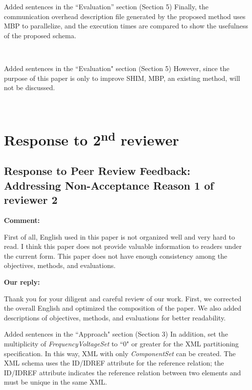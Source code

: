 \documentclass{article}
\newcommand\nd{\textsuperscript{nd}\xspace}
\begin{document}
\begin{itembox}[|]{Added sentences in the “Evaluation” section (Section 5)}
Finally, the communication overhead description file generated by the proposed method uses MBP to parallelize, and the execution times are compared to show the usefulness of the proposed schema.
\end{itembox}\\

\begin{itembox}[|]{Added sentences in the ``Evaluation" section (Section 5)}
However, since the purpose of this paper is only to improve SHIM, MBP, an existing method, will not be discussed.
\end{itembox}\\




\newpage


\section{Response to 2\nd reviewer}
\subsection{Response to Peer Review Feedback: Addressing Non-Acceptance Reason 1 of reviewer 2}
\begin{flushleft}
  \textbf{Comment:}

\end{flushleft}
\begin{adjustwidth}{1cm}{1cm}  %
 First of all, English used in this paper is not organized well and very hard to read. 
 I think this paper does not provide valuable information to readers under the current form.
 This paper does not have enough consistency among the objectives, methods, and evaluations.
\end{adjustwidth}
    
    
\begin{flushleft}
  \textbf{Our reply:}
\end{flushleft}

\begin{adjustwidth}{1cm}{1cm}  %
Thank you for your diligent and careful review of our work. First, we corrected the overall English and optimized the composition of the paper. We also added descriptions of objectives, methods, and evaluations for better readability.
\end{adjustwidth}
\bigskip
\begin{itembox}[|]{Added sentences in the ``Approach" section (Section 3)}
     In addition, set the multiplicity of \textit{FrequencyVoltageSet} to ``0" or greater for the XML partitioning specification. In this way, XML with only \textit{ComponentSet} can be created. The XML schema uses the ID/IDREF attribute for the reference relation; the ID/IDREF attribute indicates the reference relation between two elements and must be unique in the same XML. 
\end{itembox}\\
\end{document}
